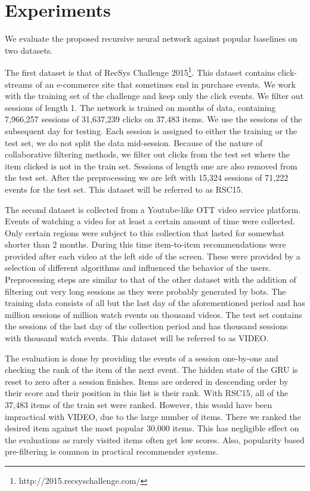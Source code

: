 \section{Experiments}\label{sec:experiments}
We evaluate the proposed recursive neural network against popular baselines on two datasets.

The first dataset is that of RecSys Challenge 2015\footnote{http://2015.recsyschallenge.com/}. This dataset contains click-streams of an e-commerce site that sometimes end in purchase events. We work with the training set of the challenge and keep only the click events. We filter out sessions of length 1. The network is trained on  months of data, containing 7,966,257 sessions of 31,637,239 clicks on 37,483 items. We use the sessions of the subsequent day for testing. Each session is assigned to either the training or the test set, we do not split the data mid-session. Because of the nature of collaborative filtering methods, we filter out clicks from the test set where the item clicked is not in the train set. Sessions of length one are also removed from the test set. After the preprocessing we are left with 15,324 sessions of 71,222 events for the test set. This dataset will be referred to as RSC15.

The second dataset is collected from a Youtube-like OTT video service platform. Events of watching a video for at least a certain amount of time were collected. Only certain regions were subject to this collection that lasted for somewhat shorter than 2 months. During this time item-to-item recommendations were provided after each video at the left side of the screen. These were provided by a selection of different algorithms and influenced the behavior of the users. Preprocessing steps are similar to that of the other dataset with the addition of filtering out very long sessions as they were probably generated by bots. The training data consists of all but the last day of the aforementioned period and has  million sessions of  million watch events on  thousand videos. The test set contains the sessions of the last day of the collection period and has  thousand sessions with  thousand watch events. This dataset will be referred to as VIDEO.

The evaluation is done by providing the events of a session one-by-one and checking the rank of the item of the next event. The hidden state of the GRU is reset to zero after a session finishes. Items are ordered in descending order by their score and their position in this list is their rank. With RSC15, all of the 37,483 items of the train set were ranked. However, this would have been impractical with VIDEO, due to the large number of items. There we ranked the desired item against the most popular 30,000 items. This has negligible effect on the evaluations as rarely visited items often get low scores. Also, popularity based pre-filtering is common in practical recommender systems.


